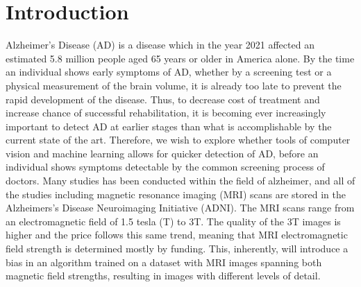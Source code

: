 \documentclass[12pt, fleqn, titlepage]{article}
\begin{document}
\begin{abstract}
	
\end{abstract}
{
\hypersetup{linkcolor=black}
\tableofcontents 
\newpage
}

\section{Introduction} \label{indledning}
Alzheimer’s Disease (AD) is a disease which in the year 2021 affected an
estimated 5.8 million people aged 65 years or older in America alone. By the
time an individual shows early symptoms of AD, whether by a screening test
or a physical measurement of the brain volume, it is already too late to prevent the rapid development of the disease. Thus, to decrease cost of treatment
and increase chance of successful rehabilitation, it is becoming ever increasingly
important to detect AD at earlier stages than what is accomplishable by the
current state of the art. Therefore, we wish to explore whether tools of computer vision and machine learning allows for quicker detection of AD, before
an individual shows symptoms detectable by the common screening process of
doctors. Many studies has been conducted within the field of alzheimer, and
all of the studies including magnetic resonance imaging (MRI) scans are stored
in the Alzheimers’s Disease Neuroimaging Initiative (ADNI). The MRI scans
range from an electromagnetic field of 1.5 tesla (T) to 3T. The quality of the 3T
images is higher and the price follows this same trend, meaning that MRI electromagnetic field strength is determined mostly by funding. This, inherently,
will introduce a bias in an algorithm trained on a dataset with MRI images
spanning both magnetic field strengths, resulting in images with different levels
of detail.
\end{document}
